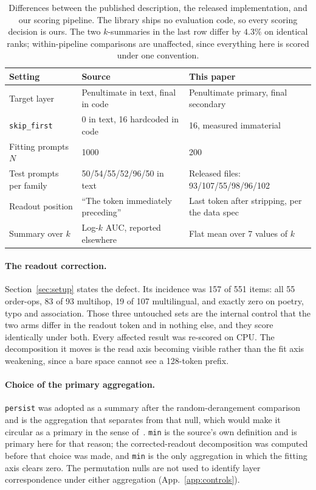 \documentclass{article}
\newcommand{\mn}{\texttt{min}}
\newcommand{\pe}{\texttt{persist}}
\begin{document}
\begin{table}[H]
\centering\small
\caption{Differences between the published description, the released implementation, and our
scoring pipeline. The library ships no evaluation code, so every scoring decision is ours. The two
$k$-summaries in the last row differ by $4.3\%$ on identical ranks; within-pipeline comparisons are
unaffected, since everything here is scored under one convention.}
\label{tab:deviations}
\begin{tabular}{@{}lll@{}}
\toprule
Setting & Source & This paper \\
\midrule
Target layer & Penultimate in text, final in code & Penultimate primary, final secondary \\
\texttt{skip\_first} & 0 in text, 16 hardcoded in code & 16, measured immaterial \\
Fitting prompts $N$ & 1000 & 200 \\
Test prompts per family & 50/54/55/52/96/50 in text & Released files: 93/107/55/98/96/102 \\
Readout position & ``The token immediately preceding'' & Last token after stripping, per the data spec \\
Summary over $k$ & Log-$k$ AUC, reported elsewhere & Flat mean over 7 values of $k$ \\
\bottomrule
\end{tabular}
\end{table}

\paragraph{The readout correction.} Section~\ref{sec:setup} states the defect. Its incidence was 157
of 551 items: all 55 order-ops, 83 of 93 multihop, 19 of 107 multilingual, and exactly zero on
poetry, typo and association. Those three untouched sets are the internal control that the two arms
differ in the readout token and in nothing else, and they score identically under both. Every
affected result was re-scored on CPU. The decomposition it moves is the read axis becoming visible
rather than the fit axis weakening, since a bare space cannot see a 128-token prefix.

\paragraph{Choice of the primary aggregation.} \pe{} was adopted as a summary after the
random-derangement comparison and is the aggregation that separates from that null, which would
make it circular as a primary in the sense of~\citet{kriegeskorte2009circular}. \mn{} is the
source's own definition and is primary here for that reason; the corrected-readout decomposition
was computed before that choice was made, and \mn{} is the only aggregation in which the fitting
axis clears zero. The permutation nulls are not used to identify layer correspondence under either
aggregation (App.~\ref{app:controls}).
\end{document}
